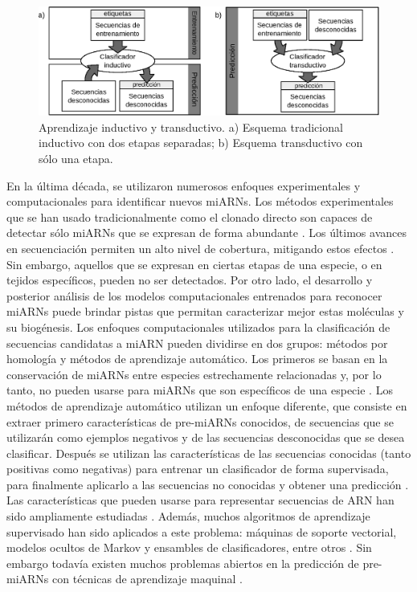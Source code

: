 \begin{figure}[tpb]
	\centering
	\includegraphics[width=\textwidth]{fig/paradigmas.eps}
	\caption[Aprendizaje inductivo vs. transductivo]{Aprendizaje inductivo y transductivo. a) Esquema tradicional inductivo con dos etapas separadas; b)
	Esquema transductivo con sólo una etapa.}
	\label{fig:schemes}
\end{figure}

En la última década, se utilizaron numerosos enfoques experimentales y computacionales para identificar nuevos miARNs. Los métodos experimentales que se han
usado tradicionalmente como el clonado directo son capaces de detectar sólo miARNs que se expresan de forma abundante \citep{kleftogiannis2013where}. Los
últimos avances en secuenciación permiten un alto nivel de cobertura, mitigando estos efectos \citep{an2013mirdeep}. Sin embargo, aquellos que se expresan en
ciertas etapas de una especie, o en tejidos específicos, pueden no ser detectados. Por otro lado, el desarrollo y posterior análisis de los modelos
computacionales entrenados para reconocer miARNs puede brindar pistas que permitan caracterizar mejor estas moléculas y su biogénesis. Los enfoques
computacionales utilizados para la clasificación de secuencias candidatas a miARN pueden dividirse en dos grupos: métodos por homología y métodos de aprendizaje
automático. Los primeros se basan en la conservación de miARNs entre especies estrechamente relacionadas y, por lo tanto, no pueden usarse para miARNs que son
específicos de una especie \citep{ng2007novo}. Los métodos de aprendizaje automático utilizan un enfoque diferente, que consiste en extraer primero
características de pre-miARNs conocidos, de secuencias que se utilizarán como ejemplos negativos y de las secuencias desconocidas que se desea clasificar.
Después se utilizan las características de las secuencias conocidas (tanto positivas como negativas) para entrenar un clasificador de forma supervisada, para
finalmente aplicarlo a las secuencias no conocidas y obtener una predicción \citep{kleftogiannis2013where}. Las características que pueden usarse para
representar secuencias de ARN han sido ampliamente estudiadas \citep{Lopes2014}. Además, muchos algoritmos de aprendizaje supervisado han sido aplicados a este
problema: máquinas de soporte vectorial, modelos ocultos de Markov y ensambles de clasificadores, entre otros \citep{kleftogiannis2013where}. Sin embargo
todavía existen muchos problemas abiertos en la predicción de pre-miARNs con técnicas de aprendizaje maquinal \citep{stegmayer2018predicting}.

